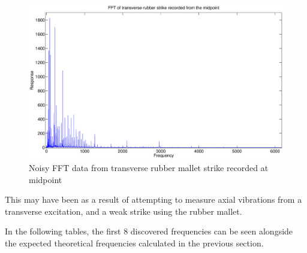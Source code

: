 \begin{figure}[H]
	\centering
	\includegraphics[width=\textwidth]{../figures/badFFT.eps}
	\caption{Noisy FFT data from transverse rubber mallet strike recorded at midpoint}
	\label{fig:badFFT}
\end{figure}

This may have been as a result of attempting to measure axial vibrations from a transverse excitation, and a weak strike using the rubber mallet. 


In the following tables, the first 8 discovered frequencies can be seen alongside the expected theoretical frequencies calculated in the previous section. 

\begin{table}[h]
\centering
{}
\caption{FFT extracted frequencies for each trial compared to theoretically expected frequencies}
\end{table}


